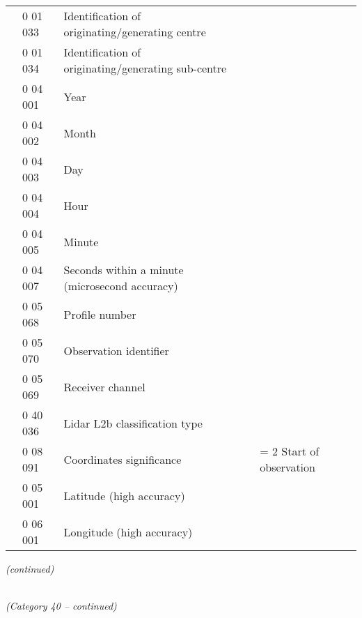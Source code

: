 \begin{longtable}[]{@{}llll@{}}
& 0 01 033 & Identification of originating/generating centre &\tabularnewline
& 0 01 034 & Identification of originating/generating sub-centre &\tabularnewline
& 0 04 001 & Year &\tabularnewline
& 0 04 002 & Month &\tabularnewline
& 0 04 003 & Day &\tabularnewline
& 0 04 004 & Hour &\tabularnewline
& 0 04 005 & Minute &\tabularnewline
& 0 04 007 & Seconds within a minute (microsecond accuracy) &\tabularnewline
& 0 05 068 & Profile number &\tabularnewline
& 0 05 070 & Observation identifier &\tabularnewline
& 0 05 069 & Receiver channel &\tabularnewline
& 0 40 036 & Lidar L2b classification type &\tabularnewline
& 0 08 091 & Coordinates significance & = 2 Start of observation\tabularnewline
& 0 05 001 & Latitude (high accuracy) &\tabularnewline
& 0 06 001 & Longitude (high accuracy) &\tabularnewline
\bottomrule
\end{longtable}

\emph{(continued)}

\emph{\\
(Category 40 -- continued)}

